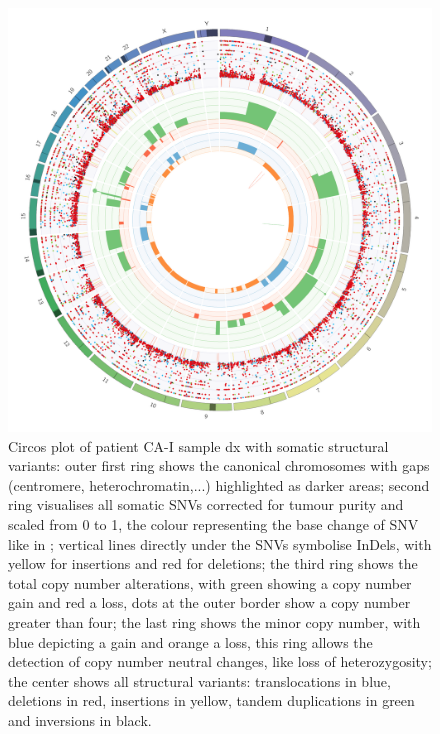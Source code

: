 \begin{figure}[p]
\centering
\includegraphics[width=.99\linewidth]{Figures/CASCADE/CA51/CA51-Ep12P3369.circos.png}
\caption[Circos plot of patient CA-I sample dx]{Circos plot of patient CA-I sample dx with somatic structural variants: outer first ring shows the canonical chromosomes with gaps (centromere, heterochromatin,...) highlighted as darker areas; second ring visualises all somatic SNVs corrected for tumour purity and scaled from 0 to 1, the colour representing the base change of SNV like in \protect\textcite{Alexandrov2013}; vertical lines directly under the SNVs symbolise InDels, with yellow for insertions and red for deletions; the third ring shows the total copy number alterations, with green showing a copy number gain and red a loss, dots at the outer border show a copy number greater than four; the last ring shows the minor copy number, with blue depicting a gain and orange a loss, this ring allows the detection of copy number neutral changes, like loss of heterozygosity; the center shows all structural variants: translocations in blue, deletions in red, insertions in yellow, tandem duplications in green and inversions in black.} \label{fig:ca51.dxcircos}
\end{figure}


